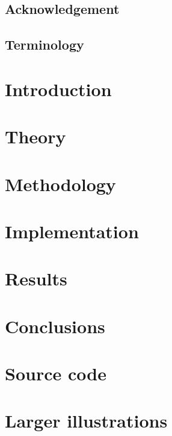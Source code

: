 \documentclass{report}
\begin{document}
\section*{Acknowledgement}

\newpage
\tableofcontents
\pagestyle{fancy}
\fancyfoot[C]{\thepage}
\newpage
\section*{Terminology}


\newpage
{}
\chapter{Introduction}
    
    \newpage
\chapter{Theory}
    
    \newpage
\chapter{Methodology}
    
    \newpage
\chapter{Implementation}
    
    \newpage
\chapter{Results}
    
    \newpage
\chapter{Conclusions}
    


\newpage
\renewcommand{\bibname}{References}
 


\appendix
\begin{appendices}
  \chapter{Source code}
  
  \chapter{Larger illustrations}
  
\end{appendices}
\end{document}
